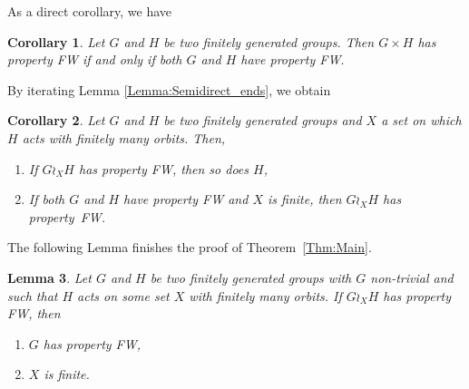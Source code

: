 \documentclass[a4paper]{article}
\newtheorem{lem}{Lemma}[section]
\newtheorem{cor}[lem]{Corollary}
\theoremstyle{definition}
\theoremstyle{remark}%
\begin{document}
%
%
As a direct corollary, we have
\begin{cor}
Let $G$ and $H$ be two finitely generated groups. Then $G\times H$ has property FW if and only if both $G$ and $H$ have property FW.
\end{cor}
%
%
By iterating Lemma \ref{Lemma:Semidirect_ends}, we obtain
%
%
\begin{cor}\label{Cor:Wreath_ends}
Let $G$ and $H$ be two finitely generated groups and $X$ a set on which $H$ acts with finitely many orbits. Then,
\begin{enumerate}
\item
If $G\wr_X H$ has property FW, then so does $H$,
\item
If both $G$ and $H$ have property FW and $X$ is finite, then $G\wr_X H$ has property~FW.
\end{enumerate}
\end{cor}
%
%
The following Lemma finishes the proof of Theorem~\ref{Thm:Main}.
%
%
\begin{lem}\label{Lem:Wreath_groups_ends}
Let $G$ and $H$ be two finitely generated groups with $G$ non-trivial and such that $H$ acts on some set $X$ with finitely many orbits.
If $G\wr_XH$ has property FW, then 
\begin{enumerate}
\item $G$ has property FW,
\item $X$ is finite.
\end{enumerate}
\end{lem}
%
%
\end{document}

